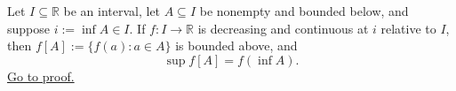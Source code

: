 \begin{theorem}
\label{thm:decreasing-image-infimum-to-supremum}
Let $I\subseteq\mathbb{R}$ be an interval, let $A\subseteq I$ be nonempty and
bounded below, and suppose $i:=\inf A\in I$.  If $f\colon I\to\mathbb{R}$ is
decreasing and continuous at $i$ relative to $I$, then
$f[A]:=\{f(a):a\in A\}$ is bounded above, and
\[
  \sup f[A]=f(\inf A).
\]
\hyperref[prf:decreasing-image-infimum-to-supremum]{Go to proof.}
\end{theorem}